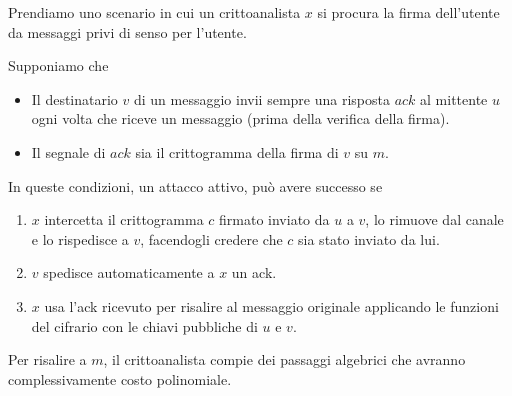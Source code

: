Prendiamo uno scenario in cui un crittoanalista $x$ si procura la firma dell'utente da messaggi privi di senso
per l'utente.

Supponiamo che
\begin{itemize}
	\item Il destinatario $v$ di un messaggio invii sempre una risposta $ack$ al mittente $u$ ogni volta che
	      riceve un messaggio (prima della verifica della firma).
	\item Il segnale di $ack$ sia il crittogramma della firma di $v$ su $m$.
\end{itemize}
In queste condizioni, un attacco attivo, pu\`o avere successo se
\begin{enumerate}
	\item $x$ intercetta il crittogramma $c$ firmato inviato da $u$ a $v$, lo rimuove dal canale e lo rispedisce a
	      $v$, facendogli credere che $c$ sia stato inviato da lui.
	\item $v$ spedisce automaticamente a $x$ un ack.
	\item $x$ usa l'ack ricevuto per risalire al messaggio originale applicando le funzioni del cifrario con le
	      chiavi pubbliche di $u$ e $v$.
\end{enumerate}
Per risalire a $m$, il crittoanalista compie dei passaggi algebrici che avranno complessivamente costo polinomiale.

